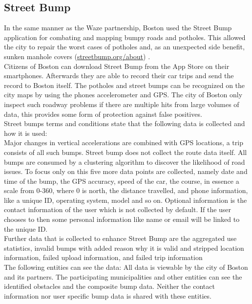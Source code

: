 \documentclass[a4paper,12pt]{report}
\begin{document}
		\subsection[Street Bump]{Street Bump \cite{EGG17}}
		\startsubsection
			In the same manner as the Waze partnership, Boston used the Street Bump application for combating and mapping bumpy roads and potholes. This allowed the city to repair the worst cases of potholes and, as an unexpected side benefit, sunken manhole covers (\href{http://www.streetbump.org/about}{streetbump.org/about}) \cite{BostonStreetBumpTOS}. \\
			Citizens of Boston can download Street Bump from the App Store on their smartphones. Afterwards they are able to record their car trips and send the record to Boston itself. The potholes and street bumps can be recognized on the city maps by using the phones accelerometer and GPS. The city of Boston only inspect such roadway problems if there are multiple hits from large volumes of data, this provides some form of protection against false positives.\\
			Street bumps terms and conditions state that the following data is collected and how it is used:\\
			Major changes in vertical accelerations are combined with GPS locations, a trip consists of all such bumps. Street bump does not collect the route data itself. 
			All bumps are consumed by a clustering algorithm to discover the likelihood of road issues. To focus only on this five more data points are collected, namely date and time of the bump, the GPS accuracy, speed of the car, the course, in essence a scale from 0-360, where 0 is north, the distance travelled, and phone information, like a unique ID, operating system, model and so on.
			Optional information is the contact information of the user which is not collected by default. If the user chooses to then some personal information like name or email will be linked to the unique ID.\\
			Further data that is collected to enhance Street Bump are the aggregated use statistics, invalid bumps with added reason why it is valid and stripped location information, failed upload information, and failed trip information\\
			The following entities can see the data:
			All data is viewable by the city of Boston and its partners. The participating municipalities and other entities can see the identified obstacles and the composite bump data.
			Neither the contact information nor user specific bump data is shared with these entities.
\end{document}
